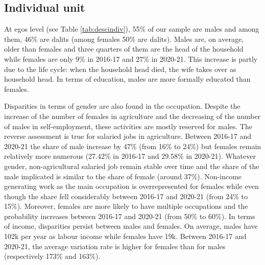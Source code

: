 \documentclass[a4paper, 12pt, onecolumn]{article}
\begin{document}

	\subsection{Individual unit}

At egos level (see Table \ref{tab:descindiv}), 55\% of our sample are males and among them, 46\% are dalits (among females 50\% are dalits).
Males are, on average, older than females and three quarters of them are the head of the household while females are only 9\% in 2016-17 and 27\% in 2020-21.
This increase is partly due to the life cycle: when the household head died, the wife takes over as household head.
In terms of education, males are more formally educated than females.

Disparities in terms of gender are also found in the occupation.
Despite the increase of the number of females in agriculture and the decreasing of the number of males in self-employment, these activities are mostly reserved for males.
The reverse assessment is true for salaried jobs in agriculture.
Between 2016-17 and 2020-21 the share of male increase by 47\% (from 16\% to 24\%) but females remain relatively more numerous (27.42\% in 2016-17 and 29.58\% in 2020-21). 
Whatever gender, non-agricultural salaried job remain stable over time and the share of the male implicated is similar to the share of female (around 37\%).
Non-income generating work as the main occupation is overrepresented for females while even though the share fell considerably between 2016-17 and 2020-21 (from 24\% to 15\%).
Moreover, females are more likely to have multiple occupations and the probability increases between 2016-17 and 2020-21 (from 50\% to 60\%).
In terms of income, disparities persist between males and females.
On average, males have \rupee102k per year as labour income while females have \rupee19k.
Between 2016-17 and 2020-21, the average variation rate is higher for females than for males (respectively 173\% and 163\%).
\end{document}
